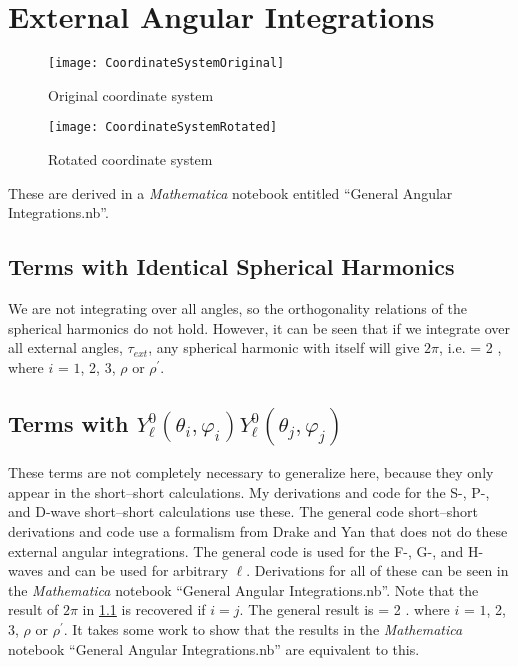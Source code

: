 \documentclass[Dissertation.tex]{subfiles}
\begin{document}
\section{External Angular Integrations}
\label{sec:AngularInt}

\begin{figure}[H]
	\centering
	\texttt{[image: CoordinateSystemOriginal]}
	\caption{Original coordinate system}
	\label{fig:CoordinateSystemOriginal}
\end{figure}

\begin{figure}[H]
	\centering
	\texttt{[image: CoordinateSystemRotated]}
	\caption{Rotated coordinate system}
	\label{fig:CoordinateSystemRotated}
\end{figure}

These are derived in a \emph{Mathematica} notebook entitled ``General Angular Integrations.nb''.

\subsection{Terms with Identical Spherical Harmonics}
\label{sec:AngSame}
We are not integrating over all angles, so the orthogonality relations of the spherical harmonics do not hold. However, it can be seen that if we integrate over all external angles, $\tau_{ext}$, any spherical harmonic with itself will give $2\pi$, i.e.
\beq
\label{eq:AngSame}
 = 2 \pi,
\eeq
where $i$ = $1$, 2, 3, $\rho$ or $\rho^\prime$.


\subsection{Terms with \texorpdfstring{$Y_\ell^0(\theta_i, \varphi_i) Y_\ell^0(\theta_j, \varphi_j)$}{Yi-Yj} }
\label{sec:AngRiRj}
These terms are not completely necessary to generalize here, because they only appear in the short--short calculations. My derivations and code for the S-, P-, and D-wave short--short calculations use these. The general code short--short derivations and code \cite{sec:} use a formalism from Drake and Yan \cite{Yan1997} that does not do these external angular integrations. The general code is used for the F-, G-, and H-waves and can be used for arbitrary $\ell$. Derivations for all of these can be seen in the \emph{Mathematica} notebook ``General Angular Integrations.nb''. Note that the result of $2\pi$ in \cref{sec:AngSame} is recovered if $i=j$. The general result is
\beq
\label{eq:AngRiRj}
 = 2 \pi {}.
\eeq
where $i$ = $1$, 2, 3, $\rho$ or $\rho^\prime$. It takes some work to show that the results in the \emph{Mathematica} notebook ``General Angular Integrations.nb'' are equivalent to this.
\end{document}
